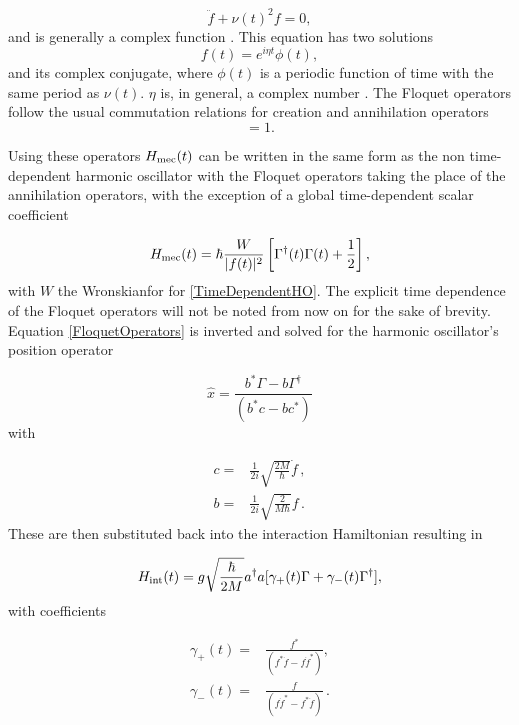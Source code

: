 \documentclass[reprint, amsmath,amssymb, aps,pra]{revtex4-1}
\begin{document}
\begin{equation} \label{TimeDependentHO}
\ddot{f} + \nu(t)^2f=0,
\end{equation} and is generally a complex function \cite{BrownPT}. This equation has two solutions \cite{HanngiFM} 
\begin{equation}
f(t) = e^{i\eta t}\phi(t), 
\end{equation}
and its complex conjugate, where $\phi(t)$ is a periodic function of
time with the same period as $\nu(t)$. $\eta$ is, in general, a complex
number \cite{WardFT}. The Floquet operators follow the usual
commutation relations for creation and annihilation operators
\begin{equation}
[\Gamma(t)^\dagger,\Gamma(t)]=1.
\end{equation}

 Using these operators $H_{\rm mec}(t)$ can be written in the same form as the non time-dependent harmonic oscillator with the Floquet operators taking the place of the annihilation operators, with the exception of a global time-dependent scalar coefficient  \cite{BrownPT}

\begin{equation}
H_{\rm mec}(t) = \hbar\frac{W}{|f(t)|^2}\left[\Gamma^\dagger(t)\Gamma(t) + \frac{1}{2}\right],
\end{equation}
with $W$ the Wronskianfor for \eqref{TimeDependentHO}. The explicit time dependence of the Floquet operators will not be noted from now on for the sake of brevity. Equation
\eqref{FloquetOperators} is inverted and solved for the harmonic
oscillator's position operator \cite{TesisMaestria}

\begin{equation}
\hat{x} = \frac{b^* \Gamma - b\Gamma^\dagger}{(b^*c-bc^*)}
\end{equation} with

\begin{align}
c =&  \frac{1}{2i}\sqrt{\frac{2M}{\hbar}}\dot{f}\, , \\
b =&  \frac{1}{2i}\sqrt{\frac{2}{M\hbar}}f\, .
\end{align}
These are then substituted back into the interaction Hamiltonian
resulting in

\begin{equation}
H_{\rm int}(t) = g\sqrt{\frac{\hbar}{2M}}a^\dagger a[\gamma_+(t)\Gamma +\gamma_-(t)\Gamma^\dagger],
\end{equation} with coefficients

\begin{align*}
\gamma_+(t)=&\frac{f^*}{(f^*\dot{f}-f\dot{f}^*)},\\
\gamma_-(t)=&\frac{f}{(f\dot{f}^*-f^*\dot{f})}\, .
\end{align*} 
\end{document}
